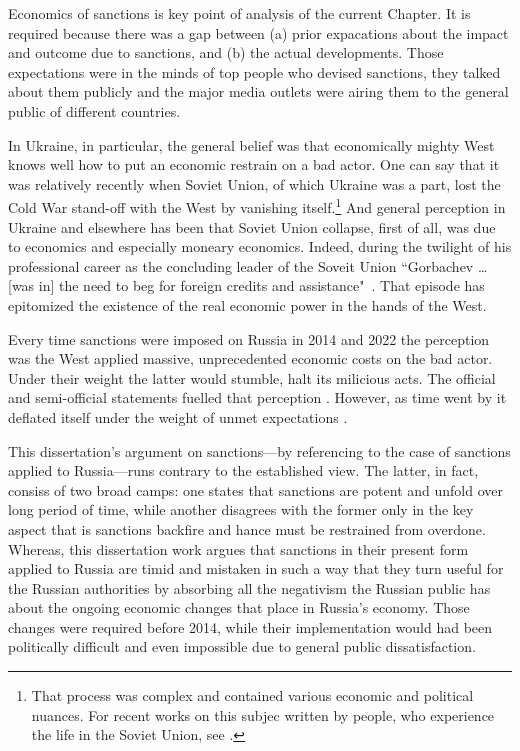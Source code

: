 Economics of sanctions is key point of analysis of the current Chapter. It is required because there was a gap between (a) prior expacations about the impact and outcome due to sanctions, and (b) the actual developments. Those expectations were in the minds of top people who devised sanctions, they talked about them publicly and the major media outlets were airing them to the general public of different countries. 

In Ukraine, in particular, the general belief was that economically mighty West knows well how to put an economic restrain on a bad actor. One can say that it was relatively recently when Soviet Union, of which Ukraine was a part, lost the Cold War stand-off with the West by vanishing itself.\footnote{That process was complex and contained various economic and political nuances. For recent works on this subjec written by people, who experience the life in the Soviet Union, see \citep{zubok2021,feygin2024,feygin2024_}.} And general perception in Ukraine and elsewhere has been that Soviet Union collapse, first of all, was due to economics and especially moneary economics. Indeed, during the twilight of his professional career as the concluding leader of the Soveit Union ``Gorbachev \dots [was in] the need to beg for foreign credits and assistance"~\citep[p.~432]{zubok2021}. That episode has epitomized the existence of the real economic power in the hands of the West.

Every time sanctions were imposed on Russia in 2014 and 2022 the perception was the West applied massive, unprecedented economic costs on the bad actor. Under their weight the latter would stumble, halt its milicious acts. The official and semi-official statements fuelled that perception \citep{ustres2014,wsj2022}. However, as time went by it deflated itself under the weight of unmet expectations \citep{wsj2024}.

This dissertation's argument on sanctions---by referencing to the case of sanctions applied to Russia---runs contrary to the established view. The latter, in fact, consiss of two broad camps: one states that sanctions are potent and unfold over long period of time, while another disagrees with the former only in the key aspect that is sanctions backfire and hance must be restrained from overdone. Whereas, this dissertation work argues that sanctions in their present form applied to Russia are timid and mistaken in such a way that they turn useful for the Russian authorities by absorbing all the negativism the Russian public has about the ongoing economic changes that place in Russia's economy. Those changes were required before 2014, while their implementation would had been politically difficult and even impossible due to general public dissatisfaction.

